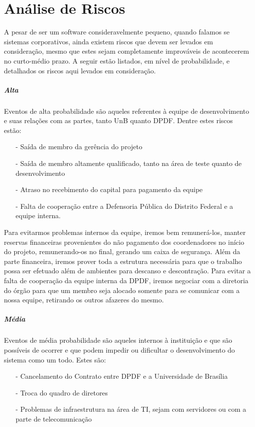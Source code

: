 \documentclass[12pt,a4paper]{report}
\begin{document}
\chapter{Análise de Riscos}

A pesar de ser um software consideravelmente pequeno, quando falamos se sistemas corporativos, ainda existem riscos que devem ser levados em consideração, mesmo que estes sejam completamente improváveis de acontecerem no curto-médio prazo. A seguir estão listados, em nível de probabilidade, e detalhados os riscos aqui levados em consideração.

\paragraph{Alta} Eventos de alta probabilidade são aqueles referentes à equipe de desenvolvimento e suas relações com as partes, tanto UnB quanto DPDF. Dentre estes riscos estão:

\begin{itemize}
\item [-] Saída de membro da gerência do projeto
\item [-] Saída de membro altamente qualificado, tanto na área de teste quanto de desenvolvimento
\item [-] Atraso no recebimento do capital para pagamento da equipe
\item [-] Falta de cooperação entre a Defensoria Pública do Distrito Federal e a equipe interna.
\end{itemize}

Para evitarmos problemas internos da equipe, iremos bem remunerá-los, manter reservas financeiras provenientes do não pagamento dos coordenadores no início do projeto, remunerando-os no final, gerando um caixa de segurança. Além da parte financeira, iremos prover toda a estrutura necessária para que o trabalho possa ser efetuado além de ambientes para descanso e descontração. Para evitar a falta de cooperação da equipe interna da DPDF, iremos negociar com a diretoria do órgão para que um membro seja alocado somente para se comunicar com a nossa equipe, retirando os outros afazeres do mesmo.

\paragraph{Média} Eventos de média probabilidade são aqueles internos à instituição e que são possíveis de ocorrer e que podem impedir ou dificultar o desenvolvimento do sistema como um todo. Estes são:
\begin{itemize}
\item [-] Cancelamento do Contrato entre DPDF e a Universidade de Brasília
\item [-] Troca do quadro de diretores
\item [-] Problemas de infraestrutura na área de TI, sejam com servidores ou com a parte de telecomunicação
\end{itemize}
\end{document}
